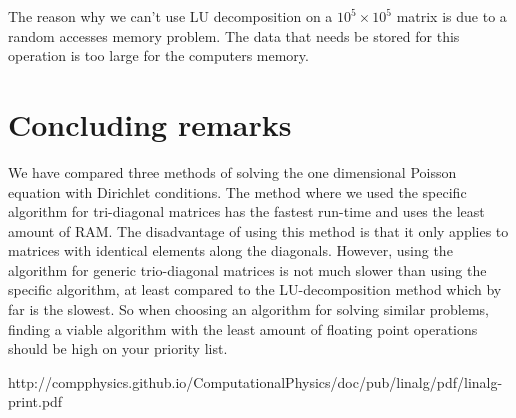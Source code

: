 \documentclass[norsk,a4paper,12pt]{article}
\begin{document}
The reason why we can’t use LU decomposition on a $10^5 \times 10^5$ matrix is due to a random accesses memory problem. The data that needs be stored for this operation is too large for the computers memory. 

\section{Concluding remarks}
We have compared three methods of solving the one dimensional Poisson equation with Dirichlet  conditions. The method where we used the specific algorithm for tri-diagonal matrices has the fastest run-time and uses the least amount of RAM. The disadvantage of using this method is that it only applies to matrices with identical elements along the diagonals. However, using the algorithm for generic trio-diagonal matrices is not much slower than using the specific algorithm, at least compared to the LU-decomposition method which by far is the slowest. So when choosing an algorithm for solving similar problems, finding a viable algorithm with the least amount of floating point operations should be high on your priority list. 

http://compphysics.github.io/ComputationalPhysics/doc/pub/linalg/pdf/linalg-print.pdf
\end{document}
